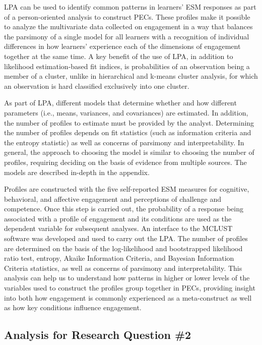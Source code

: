 \documentclass[]{book}
\theoremstyle{definition}
\theoremstyle{definition}
\theoremstyle{definition}
\theoremstyle{remark}
\begin{document}
LPA can be used to identify common patterns in learners' ESM responses
as part of a person-oriented analysis to construct PECs. These profiles
make it possible to analyze the multivariate data collected on
engagement in a way that balances the parsimony of a single model for
all learners with a recognition of individual differences in how
learners' experience each of the dimensions of engagement together at
the same time. A key benefit of the use of LPA, in addition to
likelihood estimation-based fit indices, is probabilities of an
observation being a member of a cluster, unlike in hierarchical and
k-means cluster analysis, for which an observation is hard classified
exclusively into one cluster.

As part of LPA, different models that determine whether and how
different parameters (i.e., means, variances, and covariances) are
estimated. In addition, the number of profiles to estimate must be
provided by the analyst. Determining the number of profiles depends on
fit statistics (such as information criteria and the entropy statistic)
as well as concerns of parsimony and interpretability. In general, the
approach to choosing the model is similar to choosing the number of
profiles, requiring deciding on the basis of evidence from multiple
sources. The models are described in-depth in the appendix.

Profiles are constructed with the five self-reported ESM measures for
cognitive, behavioral, and affective engagement and perceptions of
challenge and competence. Once this step is carried out, the probability
of a response being associated with a profile of engagement and its
conditions are used as the dependent variable for subsequent analyses.
An interface to the MCLUST software was developed and used to carry out
the LPA. The number of profiles are determined on the basis of the
log-likelihood and bootstrapped likelihood ratio test, entropy, Akaike
Information Criteria, and Bayesian Information Criteria statistics, as
well as concerns of parsimony and interpretability. This analysis can
help us to understand how patterns in higher or lower levels of the
variables used to construct the profiles group together in PECs,
providing insight into both how engagement is commonly experienced as a
meta-construct as well as how key conditions influence engagement.

\subsection{Analysis for Research Question
\#2}\label{analysis-for-research-question-2}
\end{document}
